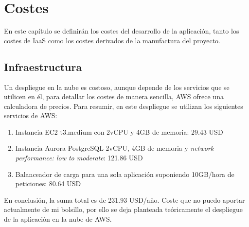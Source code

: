 \chapter{Costes}
En este capítulo se definirán los costes del desarrollo de la aplicación, tanto los costes de IaaS como los costes derivados de la manufactura del proyecto.

\section{Infraestructura}
Un despliegue en la nube es costoso, aunque depende de los servicios que se utilicen en él, para detallar los costes de manera sencilla, AWS ofrece una calculadora de precios. Para resumir, en este despliegue se utilizan los siguientes servicios de AWS:
\begin{enumerate}
    \item Instancia EC2 t3.medium con 2vCPU y 4GB de memoria: 29.43 USD
    \item Instancia Aurora PostgreSQL 2vCPU, 4GB de memoria y \emph{network performance: low to moderate}: 121.86 USD
    \item Balanceador de carga para una sola aplicación suponiendo 10GB/hora de peticiones: 80.64 USD
\end{enumerate}

En conclusión, la suma total es de 231.93 USD/año. Coste que no puedo aportar actualmente de mi bolsillo, por ello se deja planteada teóricamente el despliegue de la aplicación en la nube de AWS.